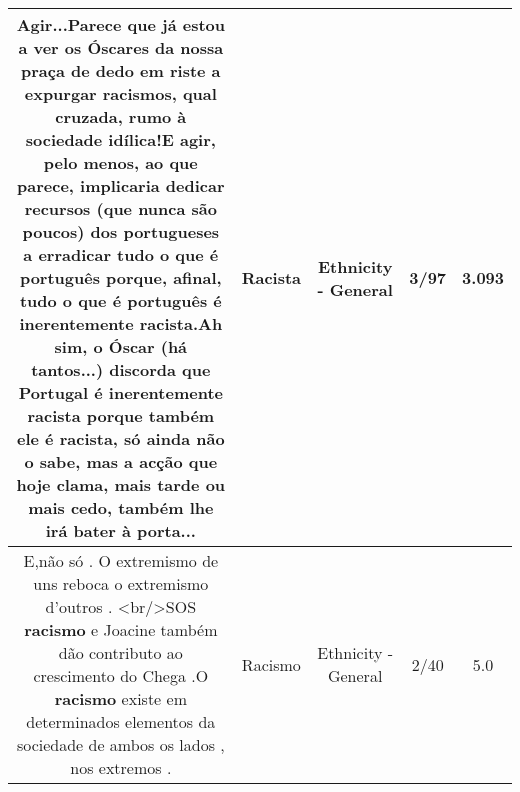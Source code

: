 \documentclass[11pt]{article}
\newlength\mylength
\begin{document}
\begin{center}
\begin{longtable}{|C{.65\mylength}|C{.30\mylength}|C{.12\mylength}|C{.12\mylength}|C{.12\mylength}|}
  \small Agir...Parece que já estou a ver os Óscares da nossa praça de dedo em riste a expurgar racismos, qual cruzada, rumo à sociedade idílica!E agir, pelo menos, ao que parece, implicaria dedicar recursos (que nunca são poucos) dos portugueses a erradicar tudo o que é português porque, afinal, tudo o que é português é inerentemente \textbf{racista}.Ah sim, o Óscar (há tantos...) discorda que Portugal é inerentemente \textbf{racista} porque também ele é \textbf{racista}, só ainda não o sabe, mas a acção que hoje clama, mais tarde ou mais cedo, também lhe irá bater à porta...\normalsize   & Racista & Ethnicity - General & 3/97 & 3.093 \\  \hline
  \small E,não só . O extremismo de uns reboca o extremismo d'outros . <br/>SOS \textbf{racismo} e Joacine também dão contributo ao crescimento do Chega .O \textbf{racismo} existe em determinados elementos da sociedade de ambos os lados , nos extremos .\normalsize   & Racismo & Ethnicity - General & 2/40 & 5.0 \\  \hline
  
\end{longtable}
\end{center}
\end{document}
